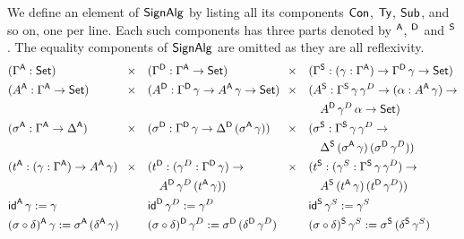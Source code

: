 \documentclass[a4paper,UKenglish,cleveref, autoref]{lipics-v2019}
\begin{document}
\begin{definition}\label{def:ads}
  We define an element of $\SignAlg$ by listing all its components
  $\Con$, $\Ty$, $\Sub$, and so on, one per line. Each such components
  has three parts denoted by $^\A$, $^\D$ and $^\S$. The equality
  components of $\SignAlg$ are omitted as they are all reflexivity.
  \begin{alignat*}{10}
    & (\Gamma^\A:\Set) && \hspace{-0.3em}\times && (\Gamma^\D:\Gamma^\A\ra\Set) && \hspace{-0.3em}\times && (\Gamma^\S:(\gamma:\Gamma^\A)\ra\Gamma^\D\,\gamma\ra\Set) \\
    & (A^\A:\Gamma^\A\ra\Set) && \hspace{-0.3em}\times && (A^\D:\Gamma^\D\,\gamma\ra A^\A\,\gamma\ra\Set) && \hspace{-0.3em}\times && (A^\S:\Gamma^\S\,\gamma\,\gamma^D\ra(\alpha:A^\A\,\gamma)\ra \\
    & && && && && \hspace{1em} A^\D\,\gamma^D\,\alpha\ra\Set) \\
    & (\sigma^\A:\Gamma^\A\ra\Delta^\A) && \hspace{-0.3em}\times && (\sigma^\D:\Gamma^\D\,\gamma\ra\Delta^\D\,(\sigma^\A\,\gamma)) && \hspace{-0.3em}\times && (\sigma^\S:\Gamma^\S\,\gamma\,\gamma^D\ra \\
    & && && && && \hspace{1em} \Delta^\S\,(\sigma^\A\,\gamma)\,(\sigma^\D\,\gamma^D)) \\
    & (t^\A:(\gamma:\Gamma^\A)\ra A^\A\,\gamma) && \hspace{-0.3em}\times && (t^\D:(\gamma^D:\Gamma^\D\,\gamma)\ra && \hspace{-0.3em}\times && (t^\S:(\gamma^S:\Gamma^\S\,\gamma\,\gamma^D)\ra \\
    & && && \hspace{1em} A^\D\,\gamma^D\,(t^\A\,\gamma)) && && \hspace{1em}  A^\S\,(t^\A\,\gamma)\,(t^\D\,\gamma^D)) \\
    & \id^\A\,\gamma := \gamma && && \id^\D\,\gamma^D:=\gamma^D && && \id^\S\,\gamma^S := \gamma^S \\
    & (\sigma\circ\delta)^\A\,\gamma := \sigma^\A\,(\delta^\A\,\gamma) && && (\sigma\circ\delta)^\D\,\gamma^D := \sigma^\D\,(\delta^\D\,\gamma^D) && && (\sigma\circ\delta)^\S\,\gamma^S := \sigma^\S\,(\delta^\S\,\gamma^S) \\

\end{alignat*}
\end{definition}
\end{document}

